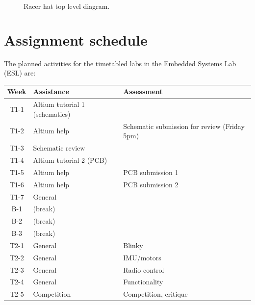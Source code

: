 \documentclass[11pt, a4paper]{article}
\begin{document}

\begin{figure}[h]
  \centering
  
  \caption{Racer hat top level diagram.}
\end{figure}


\vfill\pagebreak

\section{Assignment schedule}

The planned activities for the timetabled labs in the Embedded Systems
Lab (ESL) are:
%
\begin{flushleft}
  \begin{tabular}{ c l l }
    Week            &  Assistance  &  Assessment \\
    \hline \hline
    T1-1 & Altium tutorial 1 (schematics)  & \\
    T1-2 & Altium help      & Schematic submission for review (Friday 5pm) \\
    T1-3 & Schematic review & \\
    T1-4 & Altium tutorial 2 (PCB) &          \\
    T1-5 & Altium help      & PCB submission 1    \\
    T1-6 & Altium help      & PCB submission 2    \\
    T1-7 & General          &                   \\
    \hline
    B-1  & (break)          &                   \\
    B-2  & (break)          &                   \\
    B-3  & (break)          &                   \\
    \hline
    T2-1 & General          & Blinky            \\
    T2-2 & General          & IMU/motors        \\
    T2-3 & General          & Radio control     \\
    T2-4 & General          & Functionality     \\
    T2-5 & Competition      & Competition, critique  \\
  \end{tabular}
\end{flushleft}
\end{document}
